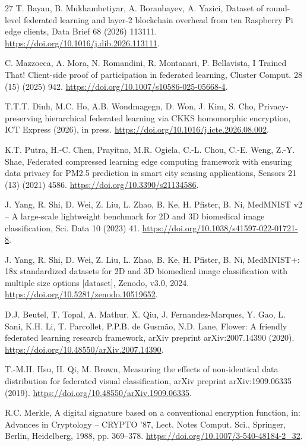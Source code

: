 \begin{thebibliography}{27}
 T. Bayan, B. Mukhambetiyar, A. Boranbayev, A. Yazici, Dataset of round-level federated learning and layer-2 blockchain overhead from ten Raspberry Pi edge clients, Data Brief 68 (2026) 113111. \url{https://doi.org/10.1016/j.dib.2026.113111}.

 C. Mazzocca, A. Mora, N. Romandini, R. Montanari, P. Bellavista, I Trained That! Client-side proof of participation in federated learning, Cluster Comput. 28 (15) (2025) 942. \url{https://doi.org/10.1007/s10586-025-05668-4}.

 T.T.T. Dinh, M.C. Ho, A.B. Wondmagegn, D. Won, J. Kim, S. Cho, Privacy-preserving hierarchical federated learning via CKKS homomorphic encryption, ICT Express (2026), in press. \url{https://doi.org/10.1016/j.icte.2026.08.002}.

 K.T. Putra, H.-C. Chen, Prayitno, M.R. Ogiela, C.-L. Chou, C.-E. Weng, Z.-Y. Shae, Federated compressed learning edge computing framework with ensuring data privacy for PM2.5 prediction in smart city sensing applications, Sensors 21 (13) (2021) 4586. \url{https://doi.org/10.3390/s21134586}.

 J. Yang, R. Shi, D. Wei, Z. Liu, L. Zhao, B. Ke, H. Pfister, B. Ni, MedMNIST v2 -- A large-scale lightweight benchmark for 2D and 3D biomedical image classification, Sci. Data 10 (2023) 41. \url{https://doi.org/10.1038/s41597-022-01721-8}.

 J. Yang, R. Shi, D. Wei, Z. Liu, L. Zhao, B. Ke, H. Pfister, B. Ni, MedMNIST+: 18x standardized datasets for 2D and 3D biomedical image classification with multiple size options [dataset], Zenodo, v3.0, 2024. \url{https://doi.org/10.5281/zenodo.10519652}.

 D.J. Beutel, T. Topal, A. Mathur, X. Qiu, J. Fernandez-Marques, Y. Gao, L. Sani, K.H. Li, T. Parcollet, P.P.B. de Gusm\~ao, N.D. Lane, Flower: A friendly federated learning research framework, arXiv preprint arXiv:2007.14390 (2020). \url{https://doi.org/10.48550/arXiv.2007.14390}.

 T.-M.H. Hsu, H. Qi, M. Brown, Measuring the effects of non-identical data distribution for federated visual classification, arXiv preprint arXiv:1909.06335 (2019). \url{https://doi.org/10.48550/arXiv.1909.06335}.

 R.C. Merkle, A digital signature based on a conventional encryption function, in: Advances in Cryptology -- CRYPTO '87, Lect. Notes Comput. Sci., Springer, Berlin, Heidelberg, 1988, pp. 369--378. \url{https://doi.org/10.1007/3-540-48184-2_32}.

\end{thebibliography}
